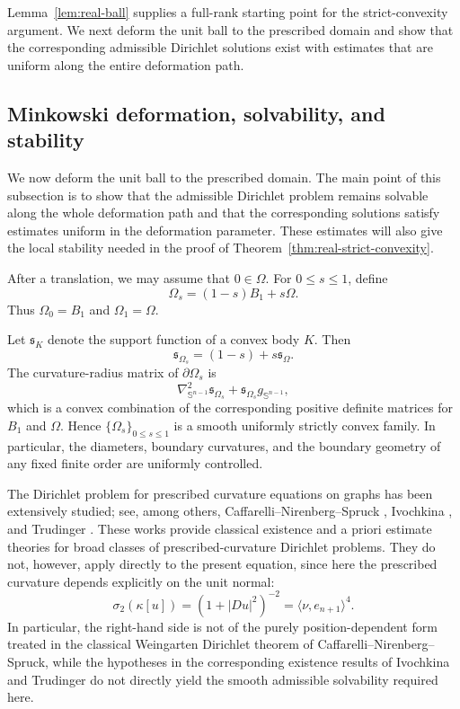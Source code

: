 \documentclass{article}
\numberwithin{equation}{section}
\begin{document}
Lemma~\ref{lem:real-ball} supplies a full-rank starting point for the
strict-convexity argument. We next deform the unit ball to the
prescribed domain and show that the corresponding admissible
Dirichlet solutions exist with estimates that are uniform along the
entire deformation path.
\subsection{Minkowski deformation, solvability, and stability}
\label{subsubsec:real-deformation}

We now deform the unit ball to the prescribed domain. The main point
of this subsection is to show that the admissible Dirichlet problem
remains solvable along the whole deformation path and that the
corresponding solutions satisfy estimates uniform in the deformation
parameter. These estimates will also give the local stability needed
in the proof of Theorem~\ref{thm:real-strict-convexity}.

After a translation, we may assume that $0\in\Omega$. For
$0\le s\le1$, define
\begin{equation}\label{eq:minkowski-path}
\Omega_s=(1-s)B_1+s\Omega.
\end{equation}
Thus $\Omega_0=B_1$ and $\Omega_1=\Omega$.

Let $\mathfrak{s}_K$ denote the support function of a convex body $K$.
Then
\[
\mathfrak{s}_{\Omega_s}
=(1-s)+s\mathfrak{s}_{\Omega}.
\]
The curvature-radius matrix of $\partial\Omega_s$ is
\[
\nabla_{\mathbb S^{n-1}}^2\mathfrak{s}_{\Omega_s}
+\mathfrak{s}_{\Omega_s}g_{\mathbb S^{n-1}},
\]
which is a convex combination of the corresponding positive definite
matrices for $B_1$ and $\Omega$. Hence $\{\Omega_s\}_{0\le s\le1}$
is a smooth uniformly strictly convex family. In particular, the
diameters, boundary curvatures, and the boundary geometry of any fixed
finite order are uniformly controlled.

The Dirichlet problem for prescribed curvature equations on graphs
has been extensively studied; see, among others,
Caffarelli--Nirenberg--Spruck \cite{CNS88},
Ivochkina \cite{Ivo90,Ivo91}, and Trudinger \cite{Tru90}.
These works provide classical existence and a priori estimate theories
for broad classes of prescribed-curvature Dirichlet problems.
They do not, however, apply directly to the present equation, since here
the prescribed curvature depends explicitly on the unit normal:
\[
\sigma_2(\kappa[u])
=(1+|Du|^2)^{-2}
=\langle \nu,e_{n+1}\rangle^4.
\]
In particular, the right-hand side is not of the purely position-dependent
form treated in the classical Weingarten Dirichlet theorem of
Caffarelli--Nirenberg--Spruck, while the hypotheses in the corresponding
existence results of Ivochkina and Trudinger do not directly yield the
smooth admissible solvability required here.
\end{document}
